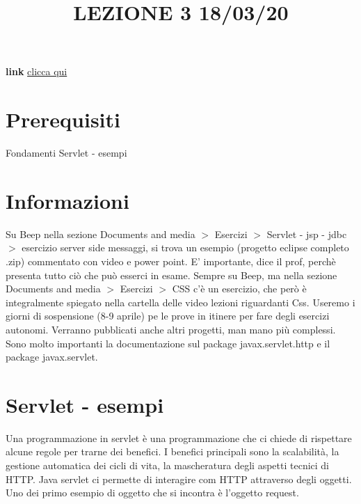 \title{LEZIONE 3 18/03/20}\newline
\textbf{link} \href{https://web.microsoftstream.com/video/53d9a40e-3109-44fc-8195-0553eedfb6d9}{clicca qui}
\section*{Prerequisiti}
Fondamenti Servlet - esempi
\section*{Informazioni}
Su Beep nella sezione Documents and media $>$ Esercizi $>$ Servlet - jsp - jdbc $>$ esercizio server side messaggi, si trova un esempio (progetto eclipse completo .zip) commentato con video e power point. E' importante, dice il prof, perchè presenta tutto ciò che può esserci in esame.\newline
\newline
Sempre su Beep, ma nella sezione Documents and media $>$ Esercizi $>$ CSS c'è un esercizio, che però è integralmente spiegato nella cartella delle video lezioni riguardanti Css.\newline
\newline
Useremo i giorni di sospensione (8-9 aprile) pe le prove in itinere per fare degli esercizi autonomi.\newline
\newline
Verranno pubblicati anche altri progetti, man mano più complessi.\newline
\newline
Sono molto importanti la documentazione sul package javax.servlet.http e il package javax.servlet.
\section{Servlet - esempi}
Una programmazione in servlet è una programmazione che ci chiede di rispettare alcune regole per trarne dei benefici. I benefici principali sono la scalabilità, la gestione automatica dei cicli di vita, la mascheratura degli aspetti tecnici di HTTP. Java servlet ci permette di interagire com HTTP attraverso degli oggetti. Uno dei primo esempio di oggetto che si incontra è l'oggetto request.
